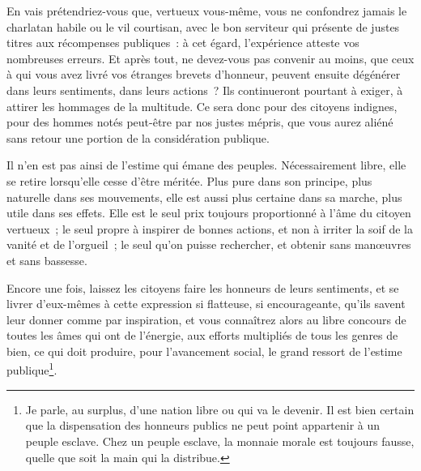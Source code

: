 \documentclass[french,twoside]{book} %
\begin{document}
En vais prétendriez-vous que, vertueux vous-même, vous ne confondrez jamais le charlatan habile ou le vil courtisan, avec le bon serviteur qui présente de justes titres aux récompenses publiques : à cet égard, l’expérience atteste vos nombreuses erreurs. Et après tout, ne devez-vous pas convenir au moins, que ceux à qui vous avez livré vos étranges brevets d’honneur, peuvent ensuite dégénérer dans leurs sentiments, dans leurs actions ? Ils continueront pourtant à exiger, à attirer les hommages de la multitude. Ce sera donc pour des citoyens indignes, pour des hommes notés peut-être par nos justes mépris, que vous aurez aliéné sans retour une portion de la considération publique.\par
Il n’en est pas ainsi de l’estime qui émane des peuples. Nécessairement libre, elle se retire lorsqu’elle cesse d’être méritée. Plus pure dans son principe, plus naturelle dans ses mouvements, elle est aussi plus certaine dans sa marche, plus utile dans ses effets. Elle est le seul prix toujours proportionné à l’âme du citoyen vertueux ; le seul propre à inspirer de bonnes actions, et non à irriter la soif de la vanité et de l’orgueil ; le seul qu’on puisse rechercher, et obtenir sans manœuvres et sans bassesse.\par
Encore une fois, laissez les citoyens faire les honneurs de leurs sentiments, et se livrer d’eux-mêmes à cette expression si flatteuse, si encourageante, qu’ils savent leur donner comme par inspiration, et vous connaîtrez alors au libre concours de toutes les âmes qui ont de l’énergie, aux efforts multipliés de tous les genres de bien, ce qui doit produire, pour l’avancement social, le grand ressort de l’estime publique\footnote{Je parle, au surplus, d’une nation libre ou qui va le devenir. Il est bien certain que la dispensation des honneurs publics ne peut point appartenir à un peuple esclave. Chez un peuple esclave, la monnaie morale est toujours fausse, quelle que soit la main qui la distribue.}.\par
\end{document}
